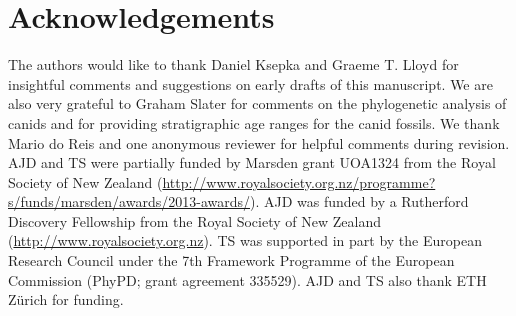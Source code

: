 \documentclass[11pt]{article}
\begin{document}
\section*{Acknowledgements}

The authors would like to thank Daniel Ksepka and Graeme T. Lloyd for insightful comments and suggestions on early drafts of this manuscript. %
We are also very grateful to Graham Slater for comments on the phylogenetic analysis of canids and for providing stratigraphic age ranges for the canid fossils. We thank Mario do Reis and one anonymous reviewer for helpful comments during revision.
AJD and TS were partially funded by Marsden grant UOA1324 from the Royal Society of New Zealand (\url{http://www.royalsociety.org.nz/programme?s/funds/marsden/awards/2013-awards/}). AJD was funded by a Rutherford Discovery Fellowship from the Royal Society of New Zealand (\url{http://www.royalsociety.org.nz}).  TS was supported in part by the European Research Council under the 7th Framework Programme of the European Commission (PhyPD; grant agreement 335529). AJD and TS also thank ETH Z\"{u}rich for funding.




\end{document}
